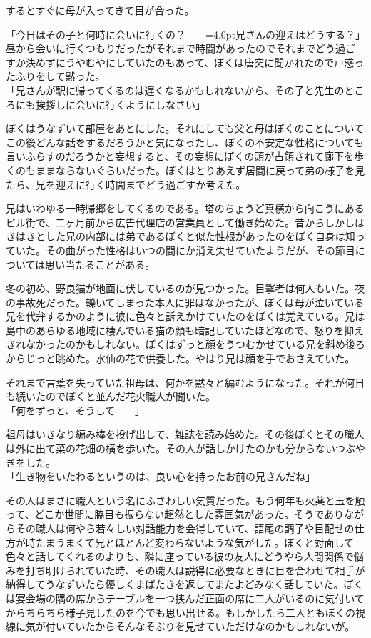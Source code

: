 \documentclass[b5j,twoside,twocolumn]{utarticle}
\begin{document}
するとすぐに母が入ってきて目が合った。


「今日はその子と何時に会いに行くの？\tbaselineshift=2.5pt------\tbaselineshift=4.0pt兄さんの迎えはどうする？」\\
昼から会いに行くつもりだったがそれまで時間があったのでそれまでどう過ごすか決めずにうやむやにしていたのもあって、ぼくは唐突に聞かれたので戸惑ったふりをして黙った。\\
「兄さんが駅に帰ってくるのは遅くなるかもしれないから、その子と先生のところにも挨拶しに会いに行くようにしなさい」


ぼくはうなずいて部屋をあとにした。それにしても父と母はぼくのことについてこの後どんな話をするだろうかと気になったし、ぼくの不安定な性格についても言いふらすのだろうかと妄想すると、その妄想にぼくの頭が占領されて廊下を歩くのもままならないぐらいだった。ぼくはとりあえず居間に戻って弟の様子を見たら、兄を迎えに行く時間までどう過ごすか考えた。


兄はいわゆる一時帰郷をしてくるのである。塔のちょうど真横から向こうにあるビル街で、二ヶ月前から広告代理店の営業員として働き始めた。昔からしかしはきはきとした兄の内部には弟であるぼくと似た性根があったのをぼく自身は知っていた。その曲がった性格はいつの間にか消え失せていたようだが、その節目については思い当たることがある。


冬の初め、野良猫が地面に伏しているのが見つかった。目撃者は何人もいた。夜の事故死だった。轢いてしまった本人に罪はなかったが、ぼくは母が泣いている兄を代弁するかのように彼に色々と訴えかけていたのをぼくは覚えている。兄は島中のあらゆる地域に棲んでいる猫の顔も暗記していたほどなので、怒りを抑えきれなかったのかもしれない。ぼくはずっと顔をうつむかせている兄を斜め後ろからじっと眺めた。水仙の花で供養した。やはり兄は顔を手でおさえていた。


それまで言葉を失っていた祖母は、何かを黙々と編むようになった。それが何日も続いたのでぼくと並んだ花火職人が聞いた。\\
「何をずっと、そうして\tbaselineshift=2.5pt------\tbaselineshift=4.0pt」


祖母はいきなり編み棒を投げ出して、雑誌を読み始めた。その後ぼくとその職人は外に出て菜の花畑の横を歩いた。その人が話しかけたのかも分からないつぶやきをした。\\
「生き物をいたわるというのは、良い心を持ったお前の兄さんだね」


その人はまさに職人という名にふさわしい気質だった。もう何年も火薬と玉を触って、どこか世間に脇目も振らない超然とした雰囲気があった。そうでありながらその職人は何やら若々しい対話能力を会得していて、語尾の調子や目配せの仕方が時たまうまくて兄とほとんど変わらないような気がした。ぼくと対面して色々と話してくれるのよりも、隣に座っている彼の友人にどうやら人間関係で悩みを打ち明けられていた時、その職人は説得に必要なときに目を合わせて相手が納得してうなずいたら優しくまばたきを返してまたよどみなく話していた。ぼくは宴会場の隅の席からテーブルを一つ挟んだ正面の席に二人がいるのに気付いてからちらちら様子見したのを今でも思い出せる。もしかしたら二人ともぼくの視線に気が付いていたからそんなそぶりを見せていただけなのかもしれないが。
\end{document}
